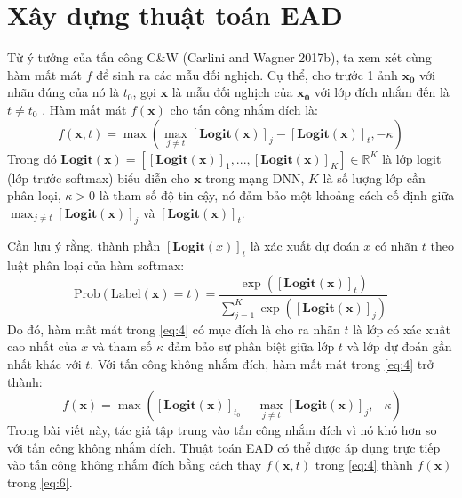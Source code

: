 \section{Xây dựng thuật toán EAD}

Từ ý tưởng của tấn công C\&W (Carlini and Wagner 2017b), ta xem xét cùng hàm mất mát $f$ để sinh 
ra các mẫu đối nghịch. Cụ thể, cho trước 1 ảnh $\mathbf{x_0}$ với nhãn đúng của nó là $t_0$, 
gọi $\mathbf{x}$ là mẫu đối nghịch của $\mathbf{x_0}$ với lớp đích nhắm đến là $t \neq t_0$ . Hàm mất mát 
$f(\mathbf{x})$ cho tấn công nhắm đích là:
\begin{equation}
    \label{eq:4}
    f(\mathbf{x}, t) = \max { \left( \max_{j \neq t} [\textbf{Logit}(\mathbf{x})]_j - 
    [\textbf{Logit}(\mathbf{x})]_t, -\kappa \right) }
\end{equation}
Trong đó $\textbf{Logit}(\mathbf{x}) = [[\textbf{Logit}(\mathbf{x})]_1, ..., 
[\textbf{Logit}(\mathbf{x})]_K] 
\in \mathbb{R}^K$ là lớp logit (lớp trước softmax) biểu diễn cho $\mathbf{x}$ trong mạng DNN, $K$
là số lượng lớp cần phân loại, $\kappa > 0$ là tham số độ tin cậy, nó đảm bảo một khoảng 
cách cố định giữa $\max_{j \neq t} [\textbf{Logit}(\mathbf{x})]_j$ và $[\textbf{Logit}(\mathbf{x})]_t$. 

Cần lưu ý rằng, thành phần $[\textbf{Logit}(x)]_t$ là xác xuất dự đoán $x$ có nhãn $t$ theo 
luật phân loại của hàm softmax:
\begin{equation}
    \label{eq:5}
    \text{Prob}(\text{Label}(\mathbf{x}) = t) = \frac{\exp([\textbf{Logit}(\mathbf{x})]_t)}{
        \sum_{j=1}^{K} \exp([\textbf{Logit}(\mathbf{x})]_j)
    }
\end{equation}
Do đó, hàm mất mát trong \ref{eq:4} có mục đích là cho ra nhãn $t$ là 
lớp có xác xuất cao nhất của $x$ và tham số $\kappa$ đảm bảo sự phân biệt giữa lớp $t$
và lớp dự đoán gần nhất khác với $t$. Với tấn công không nhắm đích, hàm mất mát trong 
\ref{eq:4} trở thành:
\begin{equation}
    \label{eq:6}\
    f(\mathbf{x}) = \max { \left([\textbf{Logit}(\mathbf{x})]_{t_0} - 
    \max_{j \neq t} [\textbf{Logit}(\mathbf{x})]_j, -\kappa \right) }
\end{equation}
Trong bài viết này, tác giả tập trung vào tấn công nhắm đích vì nó khó hơn so với tấn công không 
nhắm đích. Thuật toán EAD có thể được áp dụng trực tiếp vào tấn công không nhắm đích bằng cách thay $f(\mathbf{x},t)$ trong \ref{eq:4} thành $f(\mathbf{x})$ trong \ref{eq:6}. 

